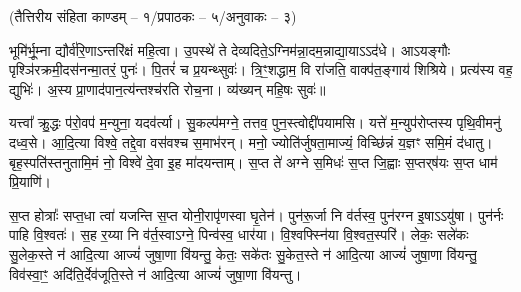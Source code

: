 \vspace{-1ex}
\centerline{\scriptsize (तैत्तिरीय संहिता काण्डम् – १/प्रपाठकः – ५/अनुवाकः – ३)}

भूमि॑र्भू॒म्ना द्यौर्व॑रि॒णाऽन्तरि॑क्षं महि॒त्वा। उ॒पस्थे॑ ते देव्यदिते॒ऽग्नि\-म॑न्ना॒दम॒न्नाद्या॒याऽऽद॑धे।
आऽयङ्गौः पृश्ञि॑रक्रमी॒\-दस॑नन्मा॒तरं॒ पुनः॑। पि॒तरं॑ च प्र॒यन्थ्सुवः॑।
त्रि॒ꣳ॒शद्धाम॒ वि रा॑जति॒ वाक्प॑त॒ङ्गाय॑ शिश्रिये। प्रत्य॑स्य वह॒ द्युभिः॑। अ॒स्य प्रा॒णाद॑पान॒त्य॑न्तश्च॑रति रोच॒ना।
व्य॑ख्यन् महि॒षः सुवः॑॥

यत्त्वा᳚ क्रु॒द्धः प॑रो॒वप॑ म॒न्युना॒ यदव॑र्त्या। सु॒कल्प॑मग्ने॒ तत्तव॒ पुन॒स्त्वोद्दी॑पयामसि।
यत्ते॑ म॒न्युप॑रोप्तस्य पृथि॒वीमनु॑ दध्व॒से। आ॒दि॒त्या विश्वे॒ तद्दे॒वा वस॑वश्च स॒माभ॑रन्।
मनो॒ ज्योति॑र्जुषता॒माज्यं॒ विच्छि॑न्नं य॒ज्ञꣳ समि॒मं द॑धातु। बृह॒स्पति॑स्तनुतामि॒मं नो॒ विश्वे॑ दे॒वा इ॒ह मा॑दयन्ताम्।
 स॒प्त ते॑ अग्ने स॒मिधः॑ स॒प्त जि॒ह्वाः स॒प्तर्‌ष॑यः स॒प्त धाम॑ प्रि॒याणि॑। 

स॒प्त होत्राः᳚ सप्त॒धा त्वा॑ यजन्ति स॒प्त योनी॒रापृ॑णस्वा घृ॒तेन॑। पुन॑रू॒र्जा नि व॑र्तस्व॒ पुन॑रग्न इ॒षाऽऽयु॑षा। पुन॑र्नः पाहि वि॒श्वतः॑। स॒ह र॒य्या नि व॑र्त॒स्वाऽग्ने॒ पिन्व॑स्व॒ धार॑या। वि॒श्वफ्स्नि॑या वि॒श्वत॒स्परि॑। लेकः॒ सले॑कः सु॒लेक॒स्ते न॑ आदि॒त्या आज्यं॑ जुषा॒णा वि॑यन्तु॒ केतः॒ सके॑तः सु॒केत॒स्ते न॑ आदि॒त्या आज्यं॑ जुषा॒णा वि॑यन्तु॒ विव॑स्वा॒ꣳ॒ अदि॑ति॒र्देव॑जूति॒स्ते न॑ आदि॒त्या आज्यं॑ जुषा॒णा वि॑यन्तु।
